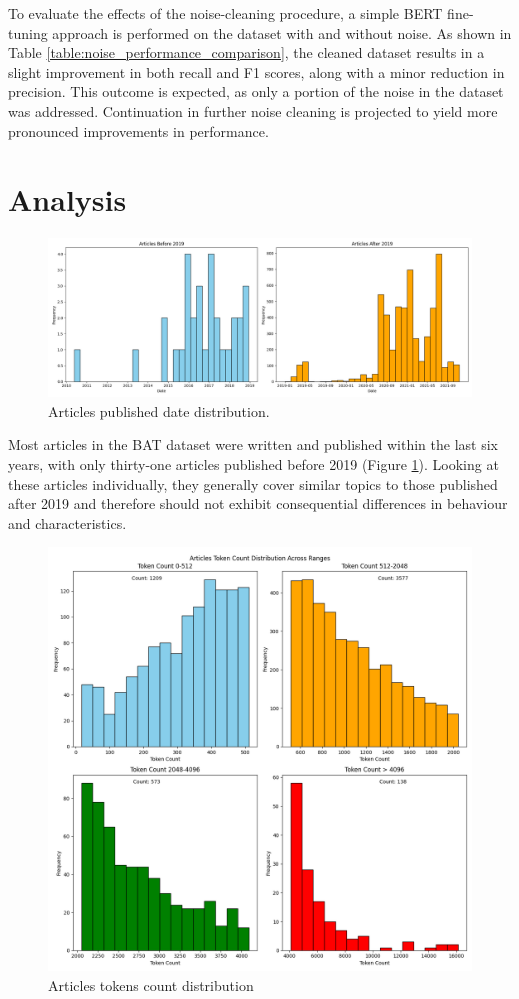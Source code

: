 To evaluate the effects of the noise-cleaning procedure, a simple BERT fine-tuning approach is performed on the dataset with and without noise. As shown in Table \ref{table:noise_performance_comparison}, the cleaned dataset results in a slight improvement in both recall and F1 scores, along with a minor reduction in precision. This outcome is expected, as only a portion of the noise in the dataset was addressed. Continuation in further noise cleaning is projected to yield more pronounced improvements in performance.


\section{Analysis}

\begin{figure}[htbp]
    \centering
    \includegraphics[width=0.9\linewidth]{figures/dates_hist.png}
    \caption{Articles published date distribution.}
    \label{fig:dates_hist}
\end{figure}

Most articles in the BAT dataset were written and published within the last six years, with only thirty-one articles published before 2019 (Figure \ref{fig:dates_hist}). Looking at these articles individually, they generally cover similar topics to those published after 2019 and therefore should not exhibit consequential differences in behaviour and characteristics.

\begin{figure}[htbp]
    \centering
    \includegraphics[width=0.8\linewidth]{figures/token_count_vx_split_hist.png}
    \caption{Articles tokens count distribution}
    \label{fig:token_hist_split}
\end{figure}

